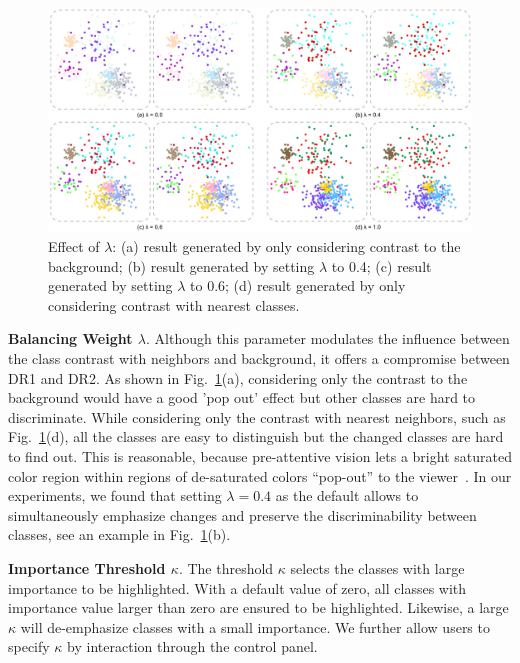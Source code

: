 \begin{figure}[!htb]
\centering
\includegraphics[width=1.0\textwidth]{figures/lambda.pdf}
\caption{Effect of $\lambda$: (a) result generated by only considering contrast to the background; (b) result generated by setting $\lambda$ to 0.4; (c) result generated by setting $\lambda$ to 0.6; (d) result generated by only considering contrast with nearest classes.}
\vspace*{-3mm}
\label{fig:lambda}
\end{figure}

\noindent\textbf{Balancing Weight $\lambda$}.
Although this parameter modulates the influence between the class contrast with neighbors and background, it offers a compromise between DR1 and DR2.
As shown in Fig.~\ref{fig:lambda}(a), considering only the contrast to the background would have a good 'pop out' effect but other classes are hard to discriminate. While considering only the contrast with nearest neighbors, such as Fig.~\ref{fig:lambda}(d), all the classes are easy to distinguish but the changed classes are hard to find out.
This is reasonable, because pre-attentive vision
lets a bright saturated color region within  regions of de-saturated colors ``pop-out'' to the viewer~\cite{healey1995visualizing}.
In our experiments, we found that setting  $\lambda=0.4$ as the default allows to simultaneously emphasize changes and preserve the discriminability between classes, see an example in Fig.~\ref{fig:lambda}(b).


\vspace{1.5mm}
\noindent\textbf{Importance Threshold $\kappa$}.
The threshold $\kappa$ selects the classes with large importance to be highlighted.
With a default value of zero, all classes with importance value larger than zero are ensured to be highlighted. Likewise, a large $\kappa$ will de-emphasize classes with a small importance.
We further allow users to specify $\kappa$ by interaction through the control panel. %

